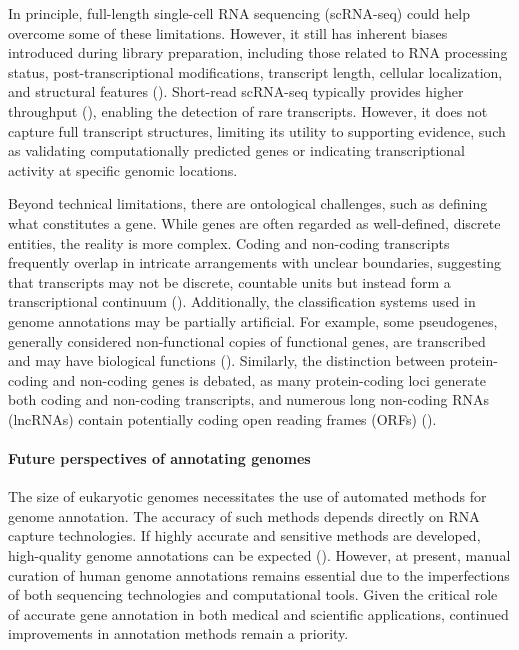 In principle, full-length single-cell RNA sequencing (scRNA-seq) could help overcome some of these limitations.
However, it still has inherent biases introduced during library preparation, including those related to RNA processing status,
post-transcriptional modifications, transcript length, cellular localization, and structural features (\cite{Guigo2023}).
Short-read scRNA-seq typically provides higher throughput (\cite{Heumos2023}), enabling the detection of rare transcripts.
However, it does not capture full transcript structures, limiting its utility to supporting evidence,
such as validating computationally predicted genes or indicating transcriptional activity at specific genomic locations.

Beyond technical limitations, there are ontological challenges, such as defining what constitutes a gene.
While genes are often regarded as well-defined, discrete entities, the reality is more complex.
Coding and non-coding transcripts frequently overlap in intricate arrangements with unclear boundaries,
suggesting that transcripts may not be discrete, countable units but instead form a transcriptional continuum (\cite{Salzberg2019}).
Additionally, the classification systems used in genome annotations may be partially artificial.
For example, some pseudogenes, generally considered non-functional copies of functional genes,
are transcribed and may have biological functions (\cite{Pei2012}).
Similarly, the distinction between protein-coding and non-coding genes is debated, as many protein-coding loci generate both coding
and non-coding transcripts, and numerous long non-coding RNAs (lncRNAs) contain potentially coding  open reading frames (ORFs) (\cite{Salzberg2019}).

\paragraph{Future perspectives of annotating genomes}

The size of eukaryotic genomes necessitates the use of automated methods for genome annotation.
The accuracy of such methods depends directly on RNA capture technologies.
If highly accurate and sensitive methods are developed, high-quality genome annotations can be expected (\cite{Salzberg2019}).
However, at present, manual curation of human genome annotations remains essential due to the imperfections of both sequencing technologies
and computational tools.
Given the critical role of accurate gene annotation in both medical and scientific applications,
continued improvements in annotation methods remain a priority.

